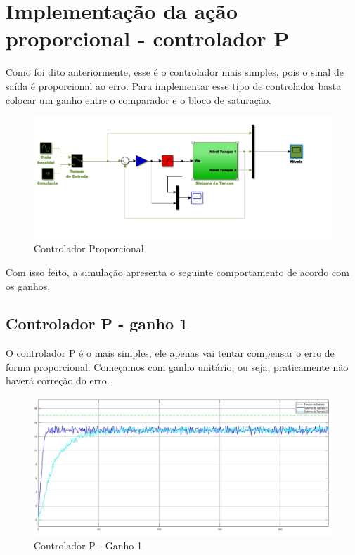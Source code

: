 \documentclass[
	12pt,				%
	openany,			%
	oneside,			%
	a4paper,			%
	english,			%
	french,				%
	spanish,			%
	brazil,				%
	]{abntex2}
\begin{document}
{\section{Implementação da ação proporcional - controlador P}

Como foi dito anteriormente, esse é o controlador mais simples, pois o sinal de saída é proporcional ao erro. Para implementar esse tipo de controlador basta colocar um ganho entre o comparador e o bloco de saturação.

\begin{figure}[h]
	\centering
	\includegraphics[scale=0.70]{controlador_p.PNG}
	\caption{Controlador Proporcional}
\end{figure}
\newpage

Com isso feito, a simulação apresenta o seguinte comportamento de acordo com os ganhos.

\subsection{Controlador P - ganho 1}

O controlador P é o mais simples, ele apenas vai tentar compensar o erro de forma proporcional. Começamos com ganho unitário, ou seja, praticamente não haverá correção do erro.

\begin{figure}[h]
	\centering
	\includegraphics[scale=0.30]{controlador_p_ganho_1.jpg}
	\caption{Controlador P - Ganho 1}
\end{figure}

}
\end{document}
